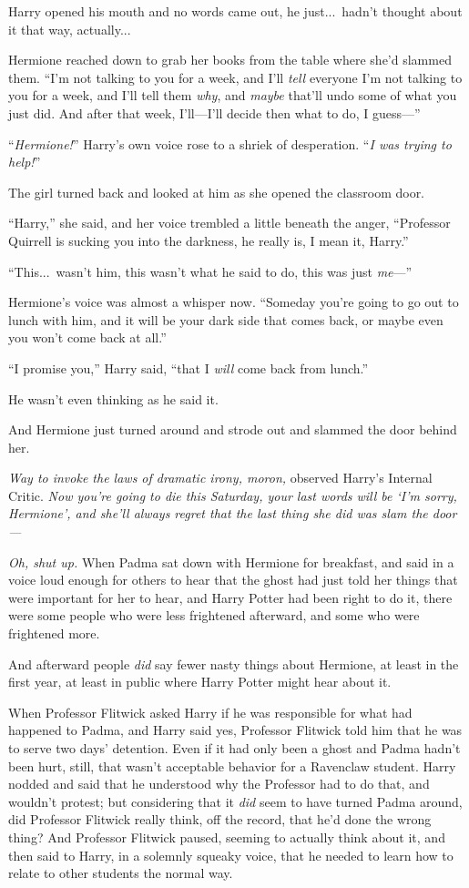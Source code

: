 Harry opened his mouth and no words came out, he just...\ hadn’t thought about it that way, actually...

Hermione reached down to grab her books from the table where she’d slammed them. “I’m not talking to you for a week, and I’ll \emph{tell} everyone I’m not talking to you for a week, and I’ll tell them \emph{why}, and \emph{maybe} that’ll undo some of what you just did. And after that week, I’ll—I’ll decide then what to do, I guess—”

“\emph{Hermione!}” Harry’s own voice rose to a shriek of desperation. “\emph{I was trying to help!}”

The girl turned back and looked at him as she opened the classroom door.

“Harry,” she said, and her voice trembled a little beneath the anger, “Professor Quirrell is sucking you into the darkness, he really is, I mean it, Harry.”

“This...\ wasn’t him, this wasn’t what he said to do, this was just \emph{me}—”

Hermione’s voice was almost a whisper now. “Someday you’re going to go out to lunch with him, and it will be your dark side that comes back, or maybe even you won’t come back at all.”

“I promise you,” Harry said, “that I \emph{will} come back from lunch.”

He wasn’t even thinking as he said it.

And Hermione just turned around and strode out and slammed the door behind her.

\emph{Way to invoke the laws of dramatic irony, moron,} observed Harry’s Internal Critic. \emph{Now you’re going to die this Saturday, your last words will be ‘I’m sorry, Hermione’, and she’ll always regret that the last thing she did was slam the door—}

\emph{Oh, shut up.}
\sbreak
When Padma sat down with Hermione for breakfast, and said in a voice loud enough for others to hear that the ghost had just told her things that were important for her to hear, and Harry Potter had been right to do it, there were some people who were less frightened afterward, and some who were frightened more.

And afterward people \emph{did} say fewer nasty things about Hermione, at least in the first year, at least in public where Harry Potter might hear about it.

When Professor Flitwick asked Harry if he was responsible for what had happened to Padma, and Harry said yes, Professor Flitwick told him that he was to serve two days’ detention. Even if it had only been a ghost and Padma hadn’t been hurt, still, that wasn’t acceptable behavior for a Ravenclaw student. Harry nodded and said that he understood why the Professor had to do that, and wouldn’t protest; but considering that it \emph{did} seem to have turned Padma around, did Professor Flitwick really think, off the record, that he’d done the wrong thing? And Professor Flitwick paused, seeming to actually think about it, and then said to Harry, in a solemnly squeaky voice, that he needed to learn how to relate to other students the normal way.

